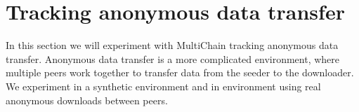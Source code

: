 



\section{Tracking anonymous data transfer}
In this section we will experiment with MultiChain tracking anonymous data transfer.
Anonymous data transfer is a more complicated environment,
where multiple peers work together to transfer data from the seeder to the downloader.
We experiment in a synthetic environment and in environment using real anonymous downloads between peers.







